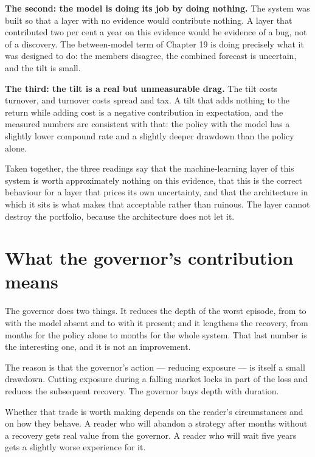 \textbf{The second: the model is doing its job by doing nothing.} The
system was built so that a layer with no evidence would contribute
nothing. A layer that contributed two per cent a year on this evidence
would be evidence of a bug, not of a discovery. The between-model term of
Chapter 19 is doing precisely what it was designed to do: the members
disagree, the combined forecast is uncertain, and the tilt is small.

\textbf{The third: the tilt is a real but unmeasurable drag.} The tilt
costs turnover, and turnover costs spread and tax. A tilt that adds
nothing to the return while adding cost is a negative contribution in
expectation, and the measured numbers are consistent with that: the
policy with the model has a slightly lower compound rate and a slightly
deeper drawdown than the policy alone.

\begin{takeaway}
Taken together, the three readings say that the machine-learning layer of
this system is worth approximately nothing on this evidence, that this is
the correct behaviour for a layer that prices its own uncertainty, and
that the architecture in which it sits is what makes that acceptable
rather than ruinous. The layer cannot destroy the portfolio, because the
architecture does not let it.
\end{takeaway}

\section{What the governor's contribution means}

The governor does two things. It reduces the depth of the worst episode,
from \numCoreDD{} to \numGovDD{} with the model absent and to
\numFullDD{} with it present; and it lengthens the recovery, from
\numCoreRecovery{} months for the policy alone to \numFullRecovery{}
months for the whole system. That last number is
the interesting one, and it is not an improvement.

The reason is that the governor's action --- reducing exposure --- is
itself a small drawdown. Cutting exposure during a falling market locks
in part of the loss and reduces the subsequent recovery. The governor
buys depth with duration.

Whether that trade is worth making depends on the reader's circumstances
and on how they behave. A reader who will abandon a strategy after
\numCoreRecovery{} months without a recovery gets real value from the
governor. A reader who will wait five years gets a slightly worse
experience for it.

